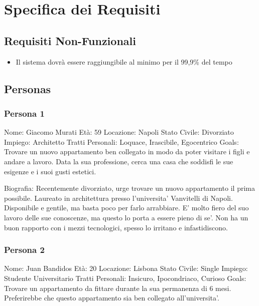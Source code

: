 \chapter{Specifica dei Requisiti}
    \section{Requisiti Non-Funzionali}

    \begin{itemize}
        \item Il sistema dovrà essere raggiungibile al minimo per il 99,9\% del tempo
        
        
    \end{itemize}

    \section{Personas}

    \subsection{Persona 1}

    Nome: Giacomo Murati
    Età: 59
    Locazione: Napoli
    Stato Civile: Divorziato
    Impiego: Architetto
    Tratti Personali: Loquace, Irascibile, Egocentrico
    Goals: Trovare un nuovo appartamento ben collegato in modo da poter visitare i figli e andare a lavoro.
           Data la sua professione, cerca una casa che soddisfi le sue esigenze e i suoi gusti estetici.        
            
    Biografia: Recentemente divorziato, urge trovare un nuovo appartamento il prima possibile. Laureato in architettura presso l'universita' Vanvitelli di Napoli. Disponibile e gentile, ma basta poco per farlo arrabbiare. E' molto fiero del suo lavoro  delle sue conoscenze, ma questo lo porta a essere pieno di se'. Non ha un buon rapporto con i mezzi tecnologici, spesso lo irritano e infastidiscono.

    \subsection{Persona 2}

    Nome: Juan Bandidos
    Età: 20
    Locazione: Lisbona
    Stato Civile: Single
    Impiego: Studente Universitario
    Tratti Personali: Insicuro, Ipocondriaco, Curioso
    Goals: Trovare un appartamento da fittare durante la sua permanenza di 6 mesi. Preferirebbe che questo appartamento sia ben collegato all'universita'.
    
